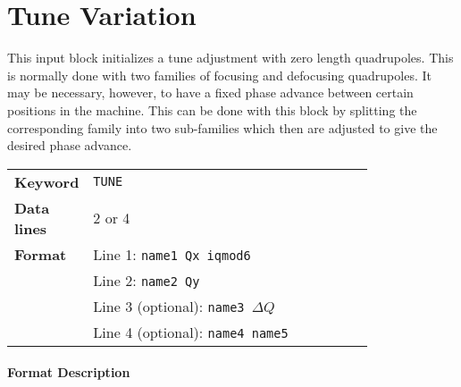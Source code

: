 \section{Tune Variation} \label{TunVar}

This input block initializes a tune adjustment with zero length quadrupoles.
This is normally done with two families of focusing and defocusing quadrupoles.
It may be necessary, however, to have a fixed phase advance between certain positions in the machine.
This can be done with this block by splitting the corresponding family into two sub-families which then are adjusted to give the desired phase advance.

\bigskip
\begin{tabular}{@{}lp{0.8\linewidth}}
    \textbf{Keyword}    & \texttt{TUNE}\index{TUNE} \\
    \textbf{Data lines} & 2 or 4 \\
    \textbf{Format}     & Line 1: \texttt{name1 Qx iqmod6} \\
                        & Line 2: \texttt{name2 Qy} \\
                        & Line 3 (optional): \texttt{name3 $\Delta Q$} \\
                        & Line 4 (optional): \texttt{name4 name5}
\end{tabular}

\paragraph{Format Description}~

